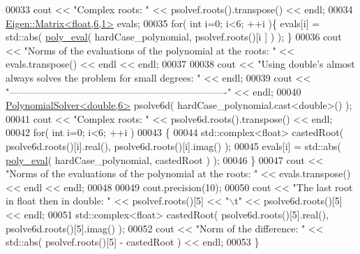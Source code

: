 \begin{DoxyCode}
00033   cout << \textcolor{stringliteral}{"Complex roots: "} << psolvef.roots().transpose() << endl;
00034   \hyperlink{group___core___module_class_eigen_1_1_matrix}{Eigen::Matrix<float,6,1>} evals;
00035   \textcolor{keywordflow}{for}( \textcolor{keywordtype}{int} i=0; i<6; ++i )\{ evals[i] = std::abs( \hyperlink{namespace_eigen_adb64ffddaa9e83634e3ab0e3fd3664f5}{poly\_eval}( hardCase\_polynomial, psolvef.roots()[i
      ] ) ); \}
00036   cout << \textcolor{stringliteral}{"Norms of the evaluations of the polynomial at the roots: "} << evals.transpose() << endl << endl;
00037 
00038   cout << \textcolor{stringliteral}{"Using double's almost always solves the problem for small degrees: "} << endl;
00039   cout << \textcolor{stringliteral}{"-------------------------------------------------------------------"} << endl;
00040   \hyperlink{class_eigen_1_1_polynomial_solver}{PolynomialSolver<double,6>} psolve6d( hardCase\_polynomial.cast<\textcolor{keywordtype}{double}>() );
00041   cout << \textcolor{stringliteral}{"Complex roots: "} << psolve6d.roots().transpose() << endl;
00042   \textcolor{keywordflow}{for}( \textcolor{keywordtype}{int} i=0; i<6; ++i )
00043   \{
00044     std::complex<float> castedRoot( psolve6d.roots()[i].real(), psolve6d.roots()[i].imag() );
00045     evals[i] = std::abs( \hyperlink{namespace_eigen_adb64ffddaa9e83634e3ab0e3fd3664f5}{poly\_eval}( hardCase\_polynomial, castedRoot ) );
00046   \}
00047   cout << \textcolor{stringliteral}{"Norms of the evaluations of the polynomial at the roots: "} << evals.transpose() << endl << endl;
00048 
00049   cout.precision(10);
00050   cout << \textcolor{stringliteral}{"The last root in float then in double: "} << psolvef.roots()[5] << \textcolor{stringliteral}{"\(\backslash\)t"} << psolve6d.roots()[5] <<
       endl;
00051   std::complex<float> castedRoot( psolve6d.roots()[5].real(), psolve6d.roots()[5].imag() );
00052   cout << \textcolor{stringliteral}{"Norm of the difference: "} << std::abs( psolvef.roots()[5] - castedRoot ) << endl;
00053 \}
\end{DoxyCode}

